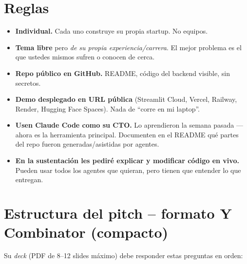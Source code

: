\documentclass[10.5pt,a4paper]{article}
\begin{document}
\section{Reglas}

\begin{itemize}[leftmargin=1.1em,itemsep=1pt,topsep=0pt]
  \item \textbf{Individual.} Cada uno construye su propia startup. No equipos.
  \item \textbf{Tema libre} pero \emph{de su propia experiencia/carrera}.
        El mejor problema es el que ustedes mismos sufren o conocen de cerca.
  \item \textbf{Repo p\'ublico en GitHub.} README, c\'odigo del backend visible, sin secretos.
  \item \textbf{Demo desplegado en URL p\'ublica} (Streamlit Cloud, Vercel, Railway,
        Render, Hugging Face Spaces). Nada de ``corre en mi laptop''.
  \item \textbf{Usen Claude Code como su CTO.} Lo aprendieron la semana pasada
        --- ahora es la herramienta principal. Documenten en el README qu\'e partes
        del repo fueron generadas/asistidas por agentes.
  \item \textbf{En la sustentaci\'on les pedir\'e explicar y modificar c\'odigo en vivo.}
        Pueden usar todos los agentes que quieran, pero tienen que entender lo que entregan.
\end{itemize}

\section{Estructura del pitch -- formato Y Combinator (compacto)}

Su \emph{deck} (PDF de 8--12 slides m\'aximo) debe responder estas preguntas en orden:
\end{document}
